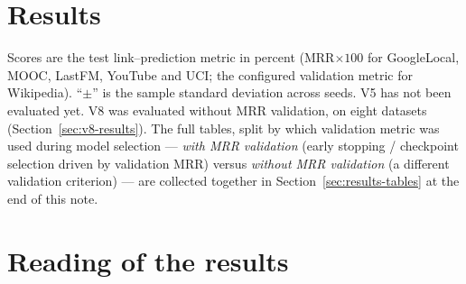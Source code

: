\documentclass[11pt]{article}
\begin{document}
\section{Results}

Scores are the test link--prediction metric in percent (MRR$\times 100$ for
GoogleLocal, MOOC, LastFM, YouTube and UCI; the configured validation metric
for Wikipedia). ``$\pm$'' is the sample standard deviation across seeds.
V5 has not been evaluated yet. V8 was evaluated without MRR validation, on
eight datasets (Section~\ref{sec:v8-results}). The full tables, split by which validation
metric was used during model selection --- \emph{with MRR validation} (early
stopping / checkpoint selection driven by validation MRR) versus \emph{without
MRR validation} (a different validation criterion) --- are collected together
in Section~\ref{sec:results-tables} at the end of this note.

\section{Reading of the results}
\end{document}
